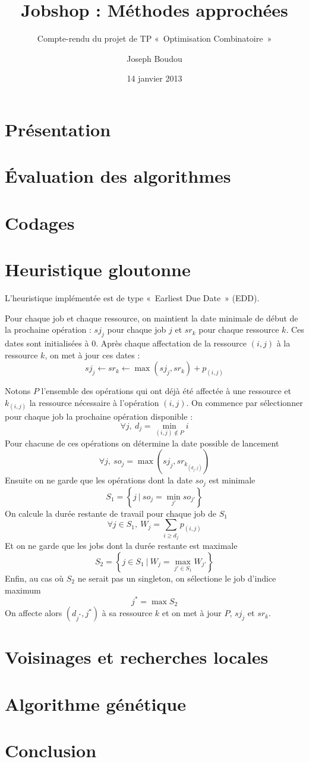 \documentclass{rapport}
\begin{document}
\title{Jobshop : Méthodes approchées}
\subtitle{Compte-rendu du projet de TP «~Optimisation Combinatoire~»}
\author{Joseph Boudou}
\date{14 janvier 2013}
\maketitle

\section{Présentation}

\section{Évaluation des algorithmes}

\section{Codages}

\section{Heuristique gloutonne}

L'heuristique implémentée est de type «~Earliest Due Date~» (EDD).

Pour chaque job et chaque ressource, on maintient la date minimale de début de la prochaine
opération : $sj_j$ pour chaque job $j$ et $sr_k$ pour chaque ressource $k$. Ces dates sont
initialisées à $0$. Après chaque affectation de la ressource $(i,j)$ à la ressource $k$, on met à
jour ces dates :
$$ sj_j \leftarrow sr_k \leftarrow \max (sj_j, sr_k) + p_{(i,j)} $$

Notons $P$ l'ensemble des opérations qui ont déjà été affectée à une ressource et $k_{(i,j)}$
la ressource nécessaire à l'opération $(i,j)$. On commence par sélectionner pour chaque job la
prochaine opération disponible :
$$ \forall j,~d_j = \min_{(i,j) \notin P} i $$
Pour chacune de ces opérations on détermine la date possible de lancement
$$ \forall j,~so_j = \max (sj_j, sr_{k_{(d_j,j)}}) $$
Ensuite on ne garde que les opérations dont la date $so_j$ est minimale
$$ S_1 = \left\{ j ~|~ so_j = \min_{j'} {so_{j'}} \right\} $$
On calcule la durée restante de travail pour chaque job de $S_1$
$$ \forall j \in S_1,~ W_j = \sum_{i \geq d_j}{p_{(i,j)}} $$
Et on ne garde que les jobs dont la durée restante est maximale
$$ S_2 = \left\{ j \in S_1 ~|~ W_j = \max_{j' \in S_1}{W_{j'}} \right\} $$
Enfin, au cas où $S_2$ ne serait pas un singleton, on sélectione le job d'indice maximum
$$ j^* = \max S_2 $$
On affecte alors $(d_{j^*}, j^*)$ à sa ressource $k$ et on met à jour $P$, $sj_{j}$ et $sr_k$.



\section{Voisinages et recherches locales}

\section{Algorithme génétique}

\section{Conclusion}
\end{document}
